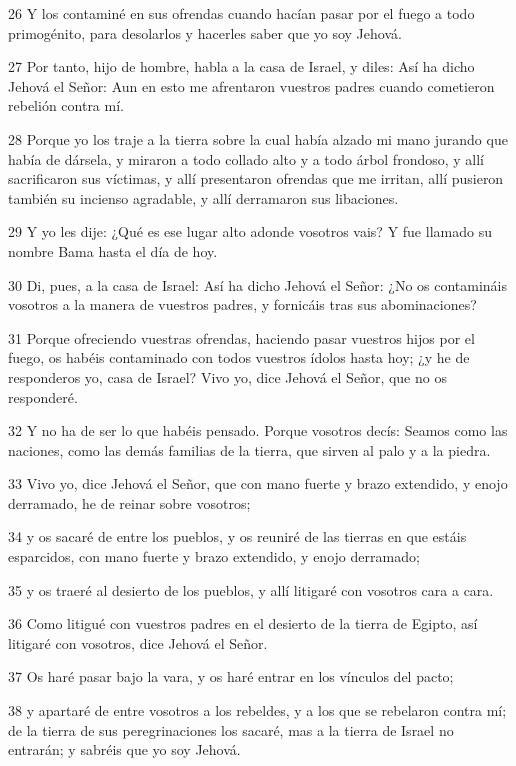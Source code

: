 \par 26 Y los contaminé en sus ofrendas cuando hacían pasar por el fuego a todo primogénito, para desolarlos y hacerles saber que yo soy Jehová.
\par 27 Por tanto, hijo de hombre, habla a la casa de Israel, y diles: Así ha dicho Jehová el Señor: Aun en esto me afrentaron vuestros padres cuando cometieron rebelión contra mí.
\par 28 Porque yo los traje a la tierra sobre la cual había alzado mi mano jurando que había de dársela, y miraron a todo collado alto y a todo árbol frondoso, y allí sacrificaron sus víctimas, y allí presentaron ofrendas que me irritan, allí pusieron también su incienso agradable, y allí derramaron sus libaciones.
\par 29 Y yo les dije: ¿Qué es ese lugar alto adonde vosotros vais? Y fue llamado su nombre Bama hasta el día de hoy.
\par 30 Di, pues, a la casa de Israel: Así ha dicho Jehová el Señor: ¿No os contamináis vosotros a la manera de vuestros padres, y fornicáis tras sus abominaciones?
\par 31 Porque ofreciendo vuestras ofrendas, haciendo pasar vuestros hijos por el fuego, os habéis contaminado con todos vuestros ídolos hasta hoy; ¿y he de responderos yo, casa de Israel? Vivo yo, dice Jehová el Señor, que no os responderé.
\par 32 Y no ha de ser lo que habéis pensado. Porque vosotros decís: Seamos como las naciones, como las demás familias de la tierra, que sirven al palo y a la piedra.
\par 33 Vivo yo, dice Jehová el Señor, que con mano fuerte y brazo extendido, y enojo derramado, he de reinar sobre vosotros;
\par 34 y os sacaré de entre los pueblos, y os reuniré de las tierras en que estáis esparcidos, con mano fuerte y brazo extendido, y enojo derramado;
\par 35 y os traeré al desierto de los pueblos, y allí litigaré con vosotros cara a cara.
\par 36 Como litigué con vuestros padres en el desierto de la tierra de Egipto, así litigaré con vosotros, dice Jehová el Señor.
\par 37 Os haré pasar bajo la vara, y os haré entrar en los vínculos del pacto;
\par 38 y apartaré de entre vosotros a los rebeldes, y a los que se rebelaron contra mí; de la tierra de sus peregrinaciones los sacaré, mas a la tierra de Israel no entrarán; y sabréis que yo soy Jehová.
